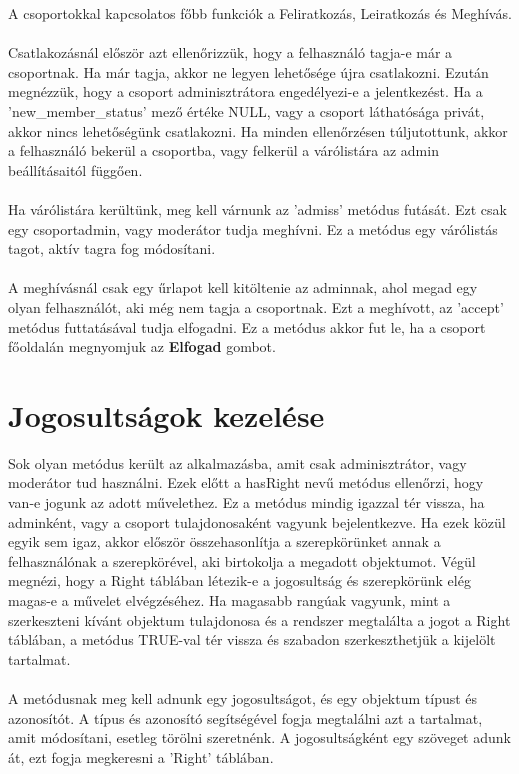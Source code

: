 \documentclass[
]{thesis-ekf}
\theoremstyle{definition}
\theoremstyle{remark}
\begin{document}
A csoportokkal kapcsolatos főbb funkciók a Feliratkozás, Leiratkozás és Meghívás.
\\\\
Csatlakozásnál először azt ellenőrizzük, hogy a felhasználó tagja-e már a csoportnak. Ha már tagja, akkor ne legyen lehetősége újra csatlakozni.
Ezután megnézzük, hogy a csoport adminisztrátora engedélyezi-e a jelentkezést. Ha a 'new\_member\_status' mező értéke NULL, vagy a csoport láthatósága privát, akkor nincs lehetőségünk csatlakozni. Ha minden ellenőrzésen túljutottunk, akkor a felhasználó bekerül a csoportba, vagy felkerül a várólistára az admin beállításaitól függően.
\\\\
Ha várólistára kerültünk, meg kell várnunk az 'admiss' metódus futását. Ezt csak egy csoportadmin, vagy moderátor tudja meghívni. Ez a metódus egy várólistás tagot, aktív tagra fog módosítani.
\\\\
A meghívásnál csak egy űrlapot kell kitöltenie az adminnak, ahol megad egy olyan felhasználót, aki még nem tagja a csoportnak. Ezt a meghívott, az 'accept' metódus futtatásával tudja elfogadni. Ez a metódus akkor fut le, ha a csoport főoldalán megnyomjuk az \textbf{Elfogad} gombot.

\vspace{5mm}
\noindent

\section{Jogosultságok kezelése}

Sok olyan metódus került az alkalmazásba, amit csak adminisztrátor, vagy moderátor tud használni. Ezek előtt a hasRight nevű metódus ellenőrzi, hogy van-e jogunk az adott művelethez. Ez a metódus mindig igazzal tér vissza, ha adminként, vagy a csoport tulajdonosaként vagyunk bejelentkezve. Ha ezek közül egyik sem igaz, akkor először összehasonlítja a szerepkörünket annak a felhasználónak a szerepkörével, aki birtokolja a megadott objektumot. Végül megnézi, hogy a Right táblában létezik-e a jogosultság és szerepkörünk elég magas-e a művelet elvégzéséhez. Ha magasabb rangúak vagyunk, mint a szerkeszteni kívánt objektum tulajdonosa és a rendszer megtalálta a jogot a Right táblában, a metódus TRUE-val tér vissza és szabadon szerkeszthetjük a kijelölt tartalmat.
\\\\
A metódusnak meg kell adnunk egy jogosultságot, és egy objektum típust és azonosítót. A típus és azonosító segítségével fogja megtalálni azt a tartalmat, amit módosítani, esetleg törölni szeretnénk. A jogosultságként egy szöveget adunk át, ezt fogja megkeresni a 'Right' táblában.
\end{document}
